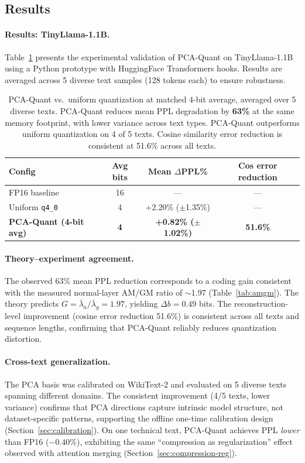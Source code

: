\subsection{Results}

\paragraph{Results: TinyLlama-1.1B.}
Table~\ref{tab:pca-ppl} presents the experimental validation of PCA-Quant on TinyLlama-1.1B using a Python prototype with HuggingFace Transformers hooks. Results are averaged across 5 diverse text samples (128 tokens each) to ensure robustness.

\begin{table}[h]
\centering
\begin{tabular}{lccc}
\toprule
\textbf{Config} & \textbf{Avg bits} & \textbf{Mean $\Delta$PPL\%} & \textbf{Cos error reduction} \\
\midrule
FP16 baseline & 16 & --- & --- \\
Uniform \texttt{q4\_0} & 4 & +2.20\% ($\pm$1.35\%) & --- \\
\textbf{PCA-Quant (4-bit avg)} & \textbf{4} & \textbf{+0.82\% ($\pm$1.02\%)} & \textbf{51.6\%} \\
\bottomrule
\end{tabular}
\caption{PCA-Quant vs.\ uniform quantization at matched 4-bit average, averaged over 5 diverse texts. PCA-Quant reduces mean PPL degradation by \textbf{63\%} at the same memory footprint, with lower variance across text types. PCA-Quant outperforms uniform quantization on 4 of 5 texts. Cosine similarity error reduction is consistent at 51.6\% across all texts.}
\label{tab:pca-ppl}
\end{table}

\paragraph{Theory--experiment agreement.}
The observed 63\% mean PPL reduction corresponds to a coding gain consistent with the measured normal-layer AM/GM ratio of $\sim$1.97 (Table~\ref{tab:amgm}). The theory predicts $G = \bar{\lambda}_a / \bar{\lambda}_g = 1.97$, yielding $\Delta b = 0.49$ bits. The reconstruction-level improvement (cosine error reduction 51.6\%) is consistent across all texts and sequence lengths, confirming that PCA-Quant reliably reduces quantization distortion.

\paragraph{Cross-text generalization.}
The PCA basis was calibrated on WikiText-2 and evaluated on 5 diverse texts spanning different domains. The consistent improvement (4/5 texts, lower variance) confirms that PCA directions capture intrinsic model structure, not dataset-specific patterns, supporting the offline one-time calibration design (Section~\ref{sec:calibration}). On one technical text, PCA-Quant achieves PPL \emph{lower} than FP16 ($-0.40\%$), exhibiting the same ``compression as regularization'' effect observed with attention merging (Section~\ref{sec:compression-reg}).

